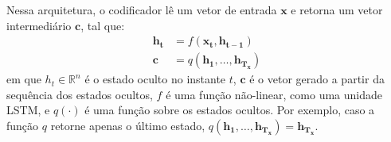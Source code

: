       
        
        
        
        


Nessa arquitetura, o codificador lê um vetor de entrada $\mathbf{x}$ e retorna
um vetor intermediário $\mathbf{c}$, tal que:   
\begin{align}
    \mathbf{h_t} &= f(\mathbf{x_t}, \mathbf{h_{t-1}}) \\
    \mathbf{c} &= q(\mathbf{h_1}, \ldots, \mathbf{h_{T_x}})
\end{align}
em que $h_t \in \mathbb{R}^n$ é o estado oculto no instante $t$, $\mathbf{c}$ é o vetor
gerado a partir da sequência dos estados ocultos, $f$ é uma função não-linear,
como uma unidade LSTM, e $q(\cdot)$ é uma função sobre os estados ocultos. Por
exemplo, caso a função $q$ retorne apenas o último estado, $q(\mathbf{h_1}, \ldots, \mathbf{h_{T_x}}) =
\mathbf{h_{T_x}}$.

